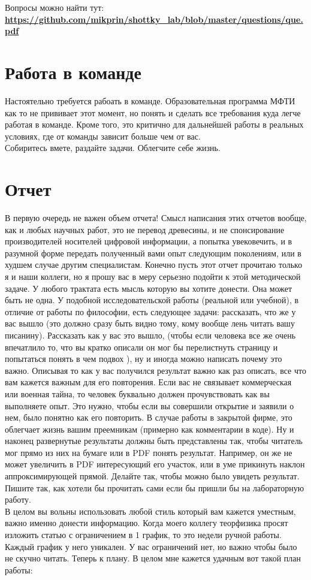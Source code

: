 \documentclass[a4paper,12pt]{article} %
\begin{document}
Вопросы можно найти тут: \textbf{\url{https://github.com/mikprin/shottky_lab/blob/master/questions/que.pdf}}




\section{Работа в команде}
Настоятельно требуется рабоать в команде. Образовательная программа МФТИ как то не прививает этот момент, но понять и сделать все требования куда легче работая в команде. Кроме того, это критично для дальнейшей работы в реальных условиях, где от команды зависит больше чем от вас.\\
Собиритесь вмете, раздайте задачи. Облегчите себе жизнь.


\section{Отчет}
В первую очередь не важен объем отчета! Смысл написания этих отчетов вообще, как и любых научных работ, это не перевод древесины, и не спонсирование производителей носителей цифровой информации, а попытка увековечить, и в разумной форме передать полученный вами опыт следующим поколениям, или в худшем случае другим специалистам. Конечно пусть этот отчет прочитаю только я и наши коллеги, но я прошу вас в меру серьезно подойти к этой методической задаче. У любого трактата есть мысль которую вы хотите донести. Она может быть не одна. У подобной исследовательской работы (реальной или учебной), в отличие от работы по философии, есть следующее задачи: рассказать, что же у вас вышло (это должно сразу быть видно тому, кому вообще лень читать вашу писанину). Рассказать как у вас это вышло,  (чтобы если человека все же очень впечатлило то, что вы кратко описали он мог бы перелистнуть страницу и попытаться понять в чем подвох ), ну и иногда можно написать почему это важно. Описывая то как у вас получился результат важно как раз описать, все что вам кажется важным для его повторения. Если вас не связывает коммерческая или военная тайна, то человек буквально должен прочувствовать как вы выполняете опыт. Это нужно, чтобы если вы совершили открытие и заявили о нем, было понятно как его повторить. В случае работы в закрытой фирме,  это облегчает жизнь вашим преемникам (примерно как комментарии в коде). Ну и наконец развернутые результаты должны быть представлены так, чтобы читатель мог прямо из них на бумаге или в PDF понять результат. Например, он же не может увеличить в PDF интересующий его участок, или в уме прикинуть наклон аппроксимирующей прямой. Делайте так, чтобы можно было увидеть результат. Пишите так, как хотели бы прочитать сами если бы пришли бы на лабораторную работу.\\
В целом вы вольны использовать любой стиль который вам кажется уместным, важно именно донести информацию. Когда моего коллегу теорфизика просят изложить статью с ограничением в 1 график, то это недели ручной работы. Каждый график у него уникален. У вас ограничений нет, но важно чтобы было не скучно читать. Теперь к плану.
В целом мне кажется удачным вот такой план работы:
\end{document}
